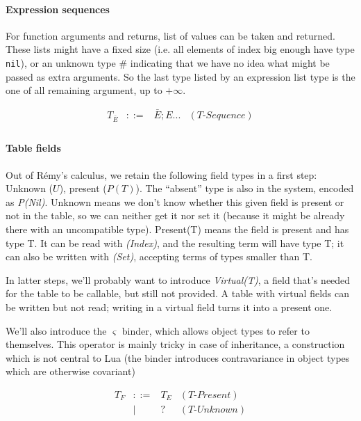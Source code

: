 \documentclass{article}
\newcommand{\eqlabel}[1]{(\textit{#1})}
\begin{document}
\paragraph{Expression sequences} For function arguments and returns, list
of values can be taken and returned. These lists might have a fixed
size (i.e. all elements of index big enough have type {\tt nil}), or
an unknown type \# indicating that we have no idea what might be
passed as extra arguments. So the last type listed by an expression
list type is the one of all remaining argument, up to $+\infty$.

\begin{equation}
\begin{array}{rcll}
T_{\bar E} &::=& \bar E; E... & \eqlabel{T-Sequence} \\
\end{array}
\end{equation}

\paragraph{Table fields}
Out of R\'emy's calculus, we retain the following field types in a
first step: Unknown ($U$), present ($P(T)$). The ``absent'' type is
also in the system, encoded as {\it P(Nil)}. Unknown means we don't
know whether this given field is present or not in the table, so we
can neither get it nor set it (because it might be already there with
an uncompatible type). Present(T) means the field is present and has
type T. It can be read with {\it(Index)}, and the resulting term
will have type T; it can also be written with {\it(Set)}, accepting
terms of types smaller than T.

In latter steps, we'll probably want to introduce {\it Virtual(T)}, a
field that's needed for the table to be callable, but still not
provided. A table with virtual fields can be written but not read;
writing in a virtual field turns it into a present one.

We'll also introduce the $\varsigma$ binder, which allows object types
to refer to themselves. This operator is mainly tricky in case of
inheritance, a construction which is not central to Lua (the binder
introduces contravariance in object types which are otherwise
covariant)

\begin{equation}
\begin{array}{rcll}
T_F &::=& T_E & \eqlabel{T-Present} \\
  &|&   ? & \eqlabel{T-Unknown} \\
\end{array}
\end{equation}
\end{document}
